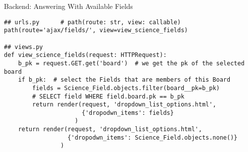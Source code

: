 \begin{frame}[c,fragile]{Backend: Answering With Available Fields}
\footnotesize
    \begin{verbatim}
## urls.py      # path(route: str, view: callable)
path(route='ajax/fields/', view=view_science_fields)

## views.py
def view_science_fields(request: HTTPRequest):
    b_pk = request.GET.get('board')  # we get the pk of the selected board
    if b_pk:  # select the Fields that are members of this Board
        fields = Science_Field.objects.filter(board__pk=b_pk) 
        # SELECT field WHERE field.board.pk == b_pk
        return render(request, 'dropdown_list_options.html',
                      {'dropodwn_items': fields}
                    )
    return render(request, 'dropdown_list_options.html',
                  {'dropodwn_items': Science_Field.objects.none()}
                )
\end{verbatim}
\end{frame}

